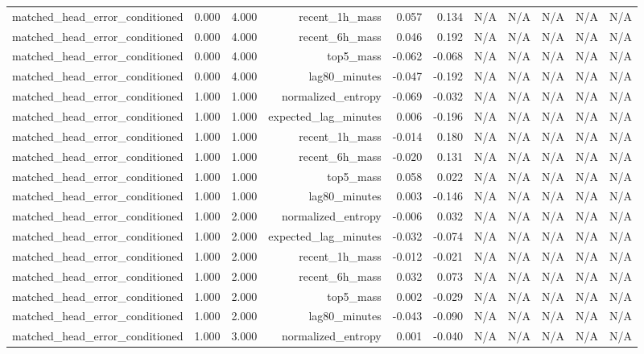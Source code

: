 \begin{table}[h!]
\begin{tabular}{lrrrrrrrrrr}
matched\_head\_error\_conditioned & 0.000 & 4.000 & recent\_1h\_mass & 0.057 & 0.134 & N/A & N/A & N/A & N/A & N/A \\
matched\_head\_error\_conditioned & 0.000 & 4.000 & recent\_6h\_mass & 0.046 & 0.192 & N/A & N/A & N/A & N/A & N/A \\
matched\_head\_error\_conditioned & 0.000 & 4.000 & top5\_mass & -0.062 & -0.068 & N/A & N/A & N/A & N/A & N/A \\
matched\_head\_error\_conditioned & 0.000 & 4.000 & lag80\_minutes & -0.047 & -0.192 & N/A & N/A & N/A & N/A & N/A \\
matched\_head\_error\_conditioned & 1.000 & 1.000 & normalized\_entropy & -0.069 & -0.032 & N/A & N/A & N/A & N/A & N/A \\
matched\_head\_error\_conditioned & 1.000 & 1.000 & expected\_lag\_minutes & 0.006 & -0.196 & N/A & N/A & N/A & N/A & N/A \\
matched\_head\_error\_conditioned & 1.000 & 1.000 & recent\_1h\_mass & -0.014 & 0.180 & N/A & N/A & N/A & N/A & N/A \\
matched\_head\_error\_conditioned & 1.000 & 1.000 & recent\_6h\_mass & -0.020 & 0.131 & N/A & N/A & N/A & N/A & N/A \\
matched\_head\_error\_conditioned & 1.000 & 1.000 & top5\_mass & 0.058 & 0.022 & N/A & N/A & N/A & N/A & N/A \\
matched\_head\_error\_conditioned & 1.000 & 1.000 & lag80\_minutes & 0.003 & -0.146 & N/A & N/A & N/A & N/A & N/A \\
matched\_head\_error\_conditioned & 1.000 & 2.000 & normalized\_entropy & -0.006 & 0.032 & N/A & N/A & N/A & N/A & N/A \\
matched\_head\_error\_conditioned & 1.000 & 2.000 & expected\_lag\_minutes & -0.032 & -0.074 & N/A & N/A & N/A & N/A & N/A \\
matched\_head\_error\_conditioned & 1.000 & 2.000 & recent\_1h\_mass & -0.012 & -0.021 & N/A & N/A & N/A & N/A & N/A \\
matched\_head\_error\_conditioned & 1.000 & 2.000 & recent\_6h\_mass & 0.032 & 0.073 & N/A & N/A & N/A & N/A & N/A \\
matched\_head\_error\_conditioned & 1.000 & 2.000 & top5\_mass & 0.002 & -0.029 & N/A & N/A & N/A & N/A & N/A \\
matched\_head\_error\_conditioned & 1.000 & 2.000 & lag80\_minutes & -0.043 & -0.090 & N/A & N/A & N/A & N/A & N/A \\
matched\_head\_error\_conditioned & 1.000 & 3.000 & normalized\_entropy & 0.001 & -0.040 & N/A & N/A & N/A & N/A & N/A \\

\end{tabular}
\end{table}
